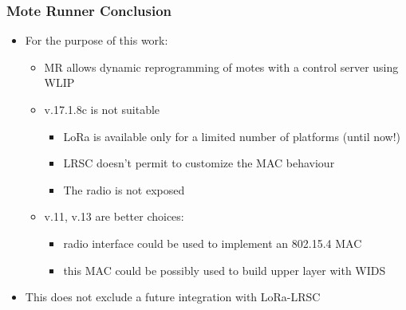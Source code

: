 %

\begin{frame}[fragile]
  \frametitle{Mote Runner Conclusion}
  \vspace{-1em}
  \begin{itemize}
    \item For the purpose of this work:
    \begin{itemize}
    	\item MR allows dynamic reprogramming of motes with a control server using WLIP
    	\item v.17.1.8c is not suitable
    	\begin{itemize}
	  \item LoRa is available only for a limited number of platforms (until now!)
	  \item LRSC doesn’t permit to customize the MAC behaviour
	  \item The radio is not exposed
    	\end{itemize}
    	\item v.11, v.13 are better choices:
    	\begin{itemize}
	  \item radio interface could be used to implement an 802.15.4 MAC 
	  \item this MAC could be possibly used to build upper layer with WIDS
    	\end{itemize}
    \end{itemize}
    \item This does not exclude a future integration with LoRa-LRSC
  \end{itemize}
\end{frame}